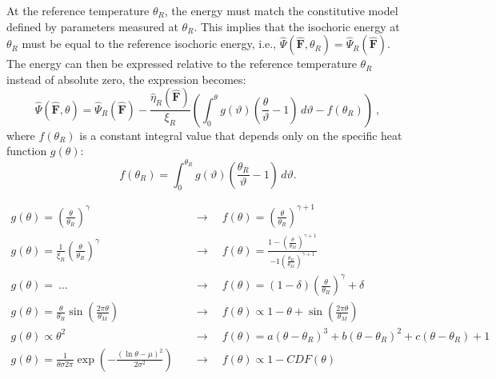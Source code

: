 \documentclass[a4paper,12pt]{article}
\newcommand{\F}{\mathbf{F}}
\newcommand{\0}{\mathbf{0}}
\begin{document}
At the reference temperature $\theta_R$, the energy must match the constitutive model defined by parameters measured at $\theta_R$. This implies that the isochoric energy at $\theta_R$ must be equal to the reference isochoric energy, i.e., $\hat{\Psi}(\hat{\F}, \theta_R) = \hat{\Psi}_R(\hat{\F})$.
The energy can then be expressed relative to the reference temperature $\theta_R$ instead of absolute zero, the expression becomes:
\begin{equation} \label{eq:thero-mech-reference}
    \hat{\Psi}(\hat{\F}, \theta) = \hat{\Psi}_R(\hat{\F})
      - \frac{\hat{\eta}_R(\hat{\F})}{\xi_R} \left(
        \int_0^\theta g(\vartheta) \left( \frac{\theta}{\vartheta} - 1 \right) \, d\vartheta
        -f(\theta_R)
      \right)\ ,
\end{equation}
where $f(\theta_R)$ is a constant integral value that depends only on the specific heat function $g(\theta)$:
\begin{equation}
  f(\theta_R) = \int_0^{\theta_R} g(\vartheta) \left( \frac{\theta_R}{\vartheta} - 1 \right) \, d\vartheta .
\end{equation}



\begin{align*}
  g(\theta) = \left(\frac{\theta}{\theta_R}\right)^\gamma \quad &\rightarrow \quad
  f(\theta) = \left(\frac{\theta}{\theta_R}\right)^{\gamma+1} \\
%
  g(\theta) = \frac{1}{\xi_R}\left(\frac{\theta}{\theta_R}\right)^\gamma \quad &\rightarrow \quad
  f(\theta) = \frac{1-\left(\frac{\theta}{\theta_M}\right)^{\gamma+1}}{-1\left(\frac{\theta_R}{\theta_M}\right)^{\gamma+1}} \\
%
  g(\theta) = \ \dots \hspace{1em} \quad &\rightarrow \quad
  f(\theta) = (1-\delta)\left(\frac{\theta}{\theta_R}\right)^\gamma + \delta \\[3pt]
%
  g(\theta) = \frac{\theta}{\theta_R}\sin\left(\frac{2\pi\theta}{\theta_M}\right) \quad &\rightarrow \quad
  f(\theta) \propto 1 -\theta + \sin\left(\frac{2\pi\theta}{\theta_M}\right) \\[5pt]
%
  g(\theta) \propto \theta^2 \quad &\rightarrow \quad
  f(\theta) = a(\theta - \theta_R)^3 + b(\theta - \theta_R)^2 + c(\theta - \theta_R) + 1 \\[5pt]
%
  g(\theta) = \frac{1}{\theta\sigma2\pi}\exp\left(-\frac{(\ln\theta-\mu)^2}{2\sigma^2}\right) \quad &\rightarrow \quad
  f(\theta) \propto 1-CDF(\theta)
\end{align*}
\end{document}
